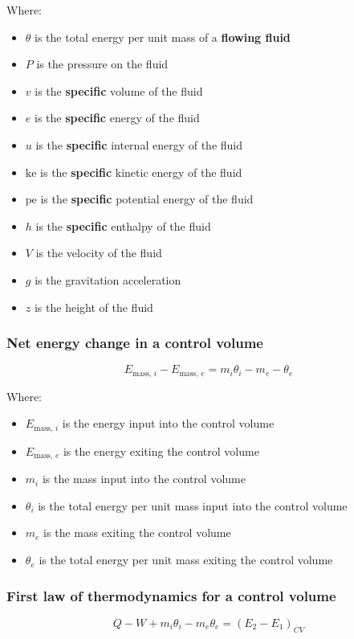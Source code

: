 \documentclass[11pt]{article}
\begin{document}
Where:
\begin{itemize}
\item \(\theta\) is the total energy per unit mass of a \textbf{flowing fluid}
\item \(P\) is the pressure on the fluid
\item \(v\) is the \textbf{specific} volume of the fluid
\item \(e\) is the \textbf{specific} energy of the fluid
\item \(u\) is the \textbf{specific} internal energy of the fluid
\item \(\text{ke}\) is the \textbf{specific} kinetic energy of the fluid
\item \(\text{pe}\) is the \textbf{specific} potential energy of the fluid
\item \(h\) is the \textbf{specific} enthalpy of the fluid
\item \(V\) is the velocity of the fluid
\item \(g\) is the gravitation acceleration
\item \(z\) is the height of the fluid
\end{itemize}

\subsubsection{Net energy change in a control volume}
\label{sec:org817f28b}
\[E_{\text{mass, } i} - E_{\text{mass, } e} = m_i \theta_i - m_e - \theta_e\]

Where:
\begin{itemize}
\item \(E_{\text{mass, } i}\) is the energy input into the control volume
\item \(E_{\text{mass, } e}\) is the energy exiting the control volume
\item \(m_i\) is the mass input into the control volume
\item \(\theta_i\) is the total energy per unit mass input into the control volume
\item \(m_e\) is the mass exiting the control volume
\item \(\theta_e\) is the total energy per unit mass exiting the control volume
\end{itemize}

\subsubsection{First law of thermodynamics for a control volume}
\label{sec:org150e5af}
\[Q - W + m_i \theta_i - m_e \theta_e = \left(E_2 - E_1 \right)_{CV}\]
\end{document}
